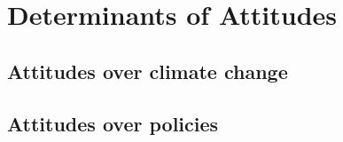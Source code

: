 \documentclass[11pt]{article}
\begin{document}
\section{Determinants of Attitudes}



    \subsection{Attitudes over climate change}

    \subsection{Attitudes over policies}

\end{document}
